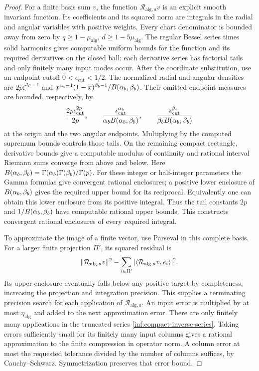 \begin{proof}
For a finite basis sum $v$, the function
$\mathcal R_{\mathrm{alg},a}v$ is an explicit smooth invariant
function. Its coefficients and its squared norm are integrals in
the radial and angular variables with positive weights.
Every chart denominator is bounded away from zero by
$q\ge1-\mu_{\mathrm{alg}}$, $d\ge1-5\mu_{\mathrm{alg}}$.
The regular Bessel series times solid harmonics gives computable
uniform bounds for the function and its required derivatives on
the closed ball: each derivative series has factorial tails and
only finitely many input modes occur.
After the coordinate substitution, use an endpoint cutoff
$0<\epsilon_{\mathrm{cut}}<1/2$. The normalized radial and angular
densities are $2p\zeta^{2p-1}$ and
$x^{\alpha_b-1}(1-x)^{\beta_b-1}/B(\alpha_b,\beta_b)$. Their omitted endpoint
measures are bounded, respectively, by
\[
 \frac{2p\epsilon_{\mathrm{cut}}^{2p}}{2p},\qquad
 \frac{\epsilon_{\mathrm{cut}}^{\alpha_b}}{\alpha_b B(\alpha_b,\beta_b)},\qquad
 \frac{\epsilon_{\mathrm{cut}}^{\beta_b}}{\beta_b B(\alpha_b,\beta_b)}
\]
at the origin and the two angular endpoints. Multiplying by the
computed supremum bounds controls those tails.
On the remaining compact rectangle, derivative bounds give a
computable modulus of continuity and rational interval Riemann
sums converge from above and below. Here
$B(\alpha_b,\beta_b)=\Gamma(\alpha_b)\Gamma(\beta_b)/\Gamma(p)$.
For these integer or half-integer parameters the Gamma formulas
give convergent rational enclosures; a positive lower enclosure
of $B(\alpha_b,\beta_b)$ gives the required upper bound for its reciprocal.
Equivalently one can obtain this lower enclosure from its positive
integral. Thus the tail constants $2p$ and $1/B(\alpha_b,\beta_b)$ have
computable rational upper bounds. This constructs convergent
rational enclosures of every required integral.

To approximate the image of a finite vector, use Parseval in this
complete basis. For a larger finite projection $\Pi'$, its squared
residual is
\[
 \lVert \mathcal R_{\mathrm{alg},a}v\rVert^2
 -\sum_{i\in\Pi'}
       |\langle\mathcal R_{\mathrm{alg},a}v,e_i\rangle|^2.
\]
Its upper enclosure eventually falls below any positive target by
completeness, increasing the projection and integration precision.
This supplies a terminating precision search for each application
of $\mathcal R_{\mathrm{alg},a}$. An input error is multiplied by at
most $\eta_{\mathrm{alg}}$ and added to the next approximation error.
There are only finitely many applications in the truncated series
\eqref{inf:compact-inverse-series}. Taking errors sufficiently small
for its finitely many input columns gives a rational approximation
to the finite compression in operator norm. A column error at most
the requested tolerance divided by the number of columns suffices,
by Cauchy--Schwarz. Symmetrization preserves
that error bound.


\end{proof}
